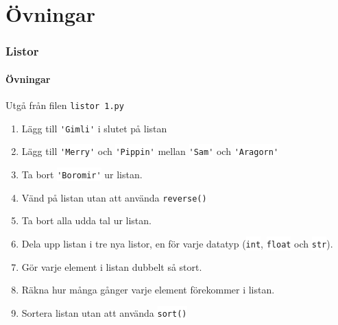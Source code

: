 \documentclass[aspectratio=169]{beamer}
\newcommand{\code}[1]{\colorbox{white}{\lstinline{#1}}}
\begin{document}
\section{Övningar}

\begin{frame}
\frametitle{Listor}
\framesubtitle{Övningar}

Utgå från filen \texttt{listor 1.py}

\begin{enumerate}
\item Lägg till \code{'Gimli'} i slutet på listan
\item Lägg till \code{'Merry'} och \code{'Pippin'} mellan \code{'Sam'} och \code{'Aragorn'}
\item Ta bort \code{'Boromir'} ur listan.
\item Vänd på listan utan att använda \code{reverse()}
\item Ta bort alla udda tal ur listan.
\item Dela upp listan i tre nya listor, en för varje datatyp (\code{int}, \code{float} och \code{str}).
\item Gör varje element i listan dubbelt så stort.
\item Räkna hur många gånger varje element förekommer i listan.
\item Sortera listan utan att använda \code{sort()}
\end{enumerate}

\end{frame}
\end{document}
